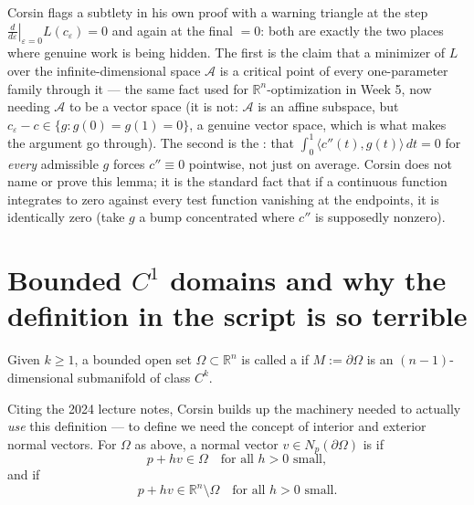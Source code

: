 \begin{ainote}
Corsin flags a subtlety in his own proof with a warning triangle at the step
$\left.\frac{d}{d\varepsilon}\right|_{\varepsilon=0}L(c_\varepsilon) = 0$ and again at the final
$= 0$: both are exactly the two places where genuine work is being hidden. The first
is the claim that a minimizer of $L$ over the infinite-dimensional space $\mathcal A$ is a
critical point of every one-parameter family through it --- the same fact used for
$\mathbb{R}^n$-optimization in Week 5, now needing $\mathcal A$ to be a vector space (it is
not: $\mathcal A$ is an affine subspace, but $c_\varepsilon - c \in \{g : g(0)=g(1)=0\}$, a genuine
vector space, which is what makes the argument go through). The second is the
: that
$\int_0^1\langle c''(t),g(t)\rangle\,dt = 0$ for \emph{every} admissible $g$ forces
$c''\equiv0$ pointwise, not just on average. Corsin does not name or prove this lemma; it is
the standard fact that if a continuous function integrates to zero against every test function
vanishing at the endpoints, it is identically zero (take $g$ a bump concentrated where $c''$
is supposedly nonzero).
\end{ainote}

\section{Bounded \texorpdfstring{$C^1$}{C1} domains and why the definition in the script is so terrible}
\label{sec:bounded_c1_domains}

\begin{definition}
\label{def:bounded_ck_domain}
Given $k \geq 1$, a bounded open set $\Omega \subset \mathbb{R}^n$ is called a
 if $M := \partial\Omega$ is an $(n-1)$-dimensional submanifold
of class $C^k$.
\end{definition}

Citing the 2024 lecture notes, Corsin builds up the machinery needed to actually \emph{use}
this definition --- to define  we need the concept of interior and exterior
normal vectors. For $\Omega$ as above, a normal vector $v \in N_p(\partial\Omega)$ is
 if
\[p + hv \in \Omega \quad \text{for all } h>0 \text{ small},\]
and  if
\[p + hv \in \mathbb{R}^n\setminus\Omega \quad \text{for all } h>0 \text{ small}.\]

